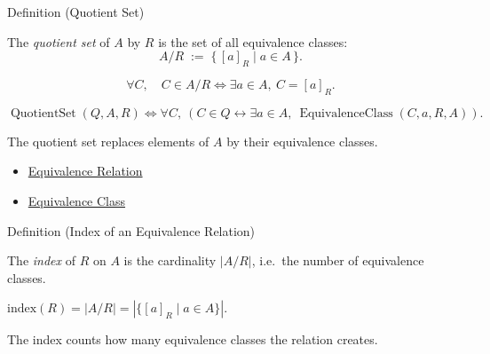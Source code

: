 \begin{definitionbox}{Definition (Quotient Set)}
\begin{definition}\label{def:quotient-set}
The \emph{quotient set} of $A$ by $R$ is the set of all equivalence classes:
\[
A / R \;:=\; \{\, [a]_R \mid a \in A \,\}.
\]
\end{definition}
\end{definitionbox}

\begin{remark*}
\[
  \forall C,\quad
  C\in A/R
  \iff
  \exists a\in A,\ C=[a]_R.
\]
\end{remark*}

\begin{remark*}
\[
  \operatorname{QuotientSet}(Q,A,R)
  \iff
  \forall C,\ (C\in Q \leftrightarrow \exists a\in A,\ \operatorname{EquivalenceClass}(C,a,R,A)).
\]
\end{remark*}

\begin{remark*}[Interpretation]
The quotient set replaces elements of $A$ by their equivalence classes.
\end{remark*}

\begin{dependencies}
\begin{itemize}
  \item \hyperref[def:equivalence-rel]{Equivalence Relation}
  \item \hyperref[def:equiv-class]{Equivalence Class}
\end{itemize}
\end{dependencies}

\begin{definitionbox}{Definition (Index of an Equivalence Relation)}
\begin{definition}\label{def:index}
The \emph{index} of $R$ on $A$ is the cardinality $|A/R|$, i.e.\ the number
of equivalence classes.
\end{definition}
\end{definitionbox}

\begin{remark*}
$\mathrm{index}(R) = |A/R| = |\{[a]_R \mid a \in A\}|$.
\end{remark*}

\begin{remark*}[Interpretation]
The index counts how many equivalence classes the relation creates.
\end{remark*}

